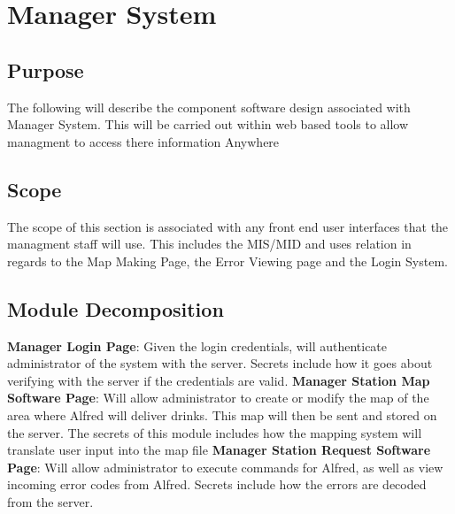 \documentclass [10pt]{article}
\begin{document}


\section {Manager System}


\subsection{Purpose}
The following will describe the component software design associated with Manager System. This will be carried out within web based tools to allow managment to access there information Anywhere

\subsection{Scope}

The scope of this section is associated with any front end user interfaces that the managment staff will use. This includes the MIS/MID and uses relation in regards to the Map Making Page, the Error Viewing page and the Login System. 

\subsection{Module Decomposition}

\textbf{Manager Login Page}: Given the login credentials, will authenticate administrator of the system with the server. Secrets include how it goes about verifying with the server if the credentials are valid.
\textbf{Manager Station Map Software Page}: Will allow administrator to create or modify the map of the area where Alfred will deliver drinks. This map will then be sent and stored on the server. The secrets of this module includes how the mapping system will translate user input into the map file
\textbf{Manager Station Request Software Page}: Will allow administrator to execute commands for Alfred, as well as view incoming error codes from Alfred. Secrets include how the errors are decoded from the server.
\end{document}
